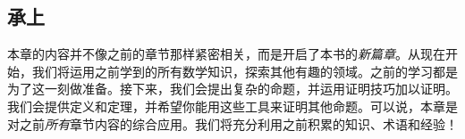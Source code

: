 
\subsection{承上}

本章的内容并不像之前的章节那样紧密相关，而是开启了本书的\emph{新篇章}。从现在开始，我们将运用之前学到的所有数学知识，探索其他有趣的领域。之前的学习都是为了这一刻做准备。接下来，我们会提出复杂的命题，并运用证明技巧加以证明。我们会提供定义和定理，并希望你能用这些工具来证明其他命题。可以说，本章是对之前\emph{所有}章节内容的综合应用。我们将充分利用之前积累的知识、术语和经验！